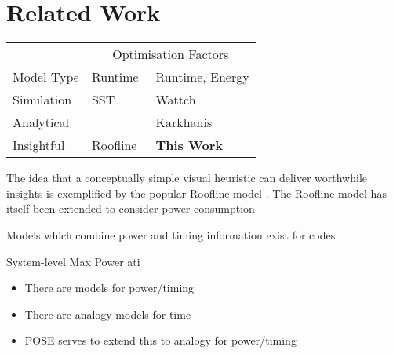 \section{Related Work}
\label{sec:related}

\begin{table}
\centering
\footnotesize
\setlength{\tabcolsep}{10pt}
\begin{tabular}{lll}
\toprule
  & \multicolumn{2}{c}{Optimisation Factors}\\ \cmidrule(r){2-3}
Model Type  & Runtime & Runtime, Energy \\
  \midrule
Simulation  & SST~\cite{rodrigues:2011aa} & Wattch~\cite{brooks:2000aa}  \\
Analytical  &  & Karkhanis \\
  Insightful  & Roofline~\cite{williams:2009aa} & \textbf{This Work} \\
\bottomrule
\end{tabular}
\end{table}


The idea that a conceptually simple visual heuristic can deliver worthwhile insights is exemplified by the popular Roofline model \cite{williams:2009aa}. The Roofline model has itself been extended to consider power consumption \cite{choi:2013aa} 



Models which combine power and timing information exist for codes 

System-level Max Power ati




\begin{itemize}
  \item There are models for power/timing
  \item There are analogy models for time
  \item POSE serves to extend this to analogy for power/timing
\end{itemize}

